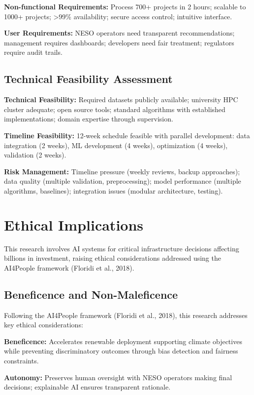 \documentclass[12pt,a4paper]{article}
\begin{document}
\textbf{Non-functional Requirements:} Process 700+ projects in 2 hours; scalable to 1000+ projects; >99\% availability; secure access control; intuitive interface.

\textbf{User Requirements:} NESO operators need transparent recommendations; management requires dashboards; developers need fair treatment; regulators require audit trails.

\subsection{Technical Feasibility Assessment}

\textbf{Technical Feasibility:} Required datasets publicly available; university HPC cluster adequate; open source tools; standard algorithms with established implementations; domain expertise through supervision.

\textbf{Timeline Feasibility:} 12-week schedule feasible with parallel development: data integration (2 weeks), ML development (4 weeks), optimization (4 weeks), validation (2 weeks).

\textbf{Risk Management:} Timeline pressure (weekly reviews, backup approaches); data quality (multiple validation, preprocessing); model performance (multiple algorithms, baselines); integration issues (modular architecture, testing).



\section{Ethical Implications}
\label{sec:ethics}

This research involves AI systems for critical infrastructure decisions affecting billions in investment, raising ethical considerations addressed using the AI4People framework (Floridi et al., 2018).

\subsection{Beneficence and Non-Maleficence}

Following the AI4People framework (Floridi et al., 2018), this research addresses key ethical considerations:

\textbf{Beneficence:} Accelerates renewable deployment supporting climate objectives while preventing discriminatory outcomes through bias detection and fairness constraints.

\textbf{Autonomy:} Preserves human oversight with NESO operators making final decisions; explainable AI ensures transparent rationale.
\end{document}
